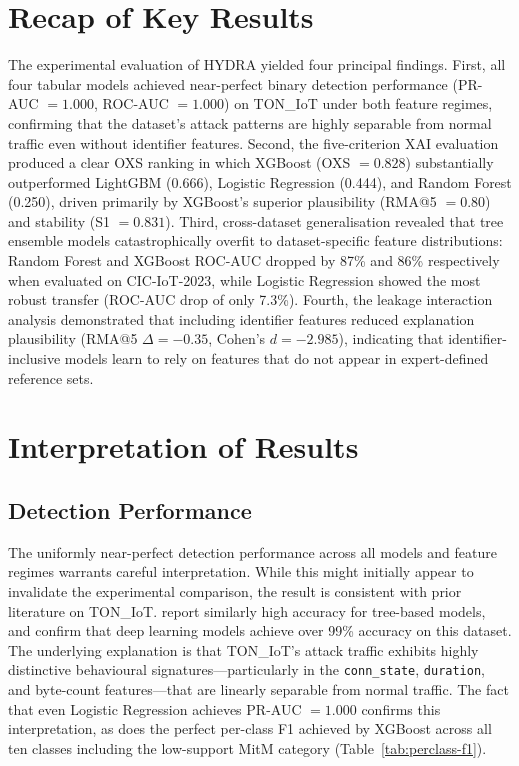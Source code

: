 \documentclass[12pt,a4paper]{report}
\begin{document}
\section{Recap of Key Results}
\label{sec:recap}

The experimental evaluation of HYDRA yielded four principal findings. First, all four tabular models achieved near-perfect binary detection performance (PR-AUC $= 1.000$, ROC-AUC $= 1.000$) on TON\_IoT under both feature regimes, confirming that the dataset's attack patterns are highly separable from normal traffic even without identifier features. Second, the five-criterion XAI evaluation produced a clear OXS ranking in which XGBoost (OXS $= 0.828$) substantially outperformed LightGBM (0.666), Logistic Regression (0.444), and Random Forest (0.250), driven primarily by XGBoost's superior plausibility (RMA@5 $= 0.80$) and stability (S1 $= 0.831$). Third, cross-dataset generalisation revealed that tree ensemble models catastrophically overfit to dataset-specific feature distributions: Random Forest and XGBoost ROC-AUC dropped by 87\% and 86\% respectively when evaluated on CIC-IoT-2023, while Logistic Regression showed the most robust transfer (ROC-AUC drop of only 7.3\%). Fourth, the leakage interaction analysis demonstrated that including identifier features reduced explanation plausibility (RMA@5 $\Delta = -0.35$, Cohen's $d = -2.985$), indicating that identifier-inclusive models learn to rely on features that do not appear in expert-defined reference sets.

\section{Interpretation of Results}
\label{sec:interpretation}

\subsection*{Detection Performance}

The uniformly near-perfect detection performance across all models and feature regimes warrants careful interpretation. While this might initially appear to invalidate the experimental comparison, the result is consistent with prior literature on TON\_IoT. \citet{alsaedi2020} report similarly high accuracy for tree-based models, and \citet{ferrag2022} confirm that deep learning models achieve over 99\% accuracy on this dataset. The underlying explanation is that TON\_IoT's attack traffic exhibits highly distinctive behavioural signatures---particularly in the \texttt{conn\_state}, \texttt{duration}, and byte-count features---that are linearly separable from normal traffic. The fact that even Logistic Regression achieves PR-AUC $= 1.000$ confirms this interpretation, as does the perfect per-class F1 achieved by XGBoost across all ten classes including the low-support MitM category (Table~\ref{tab:perclass-f1}).
\end{document}
